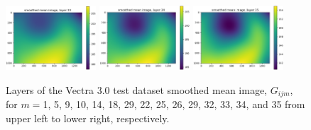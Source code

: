 \documentclass[letterpaper,11pt]{article}
\begin{document}
\begin{figure}[!ht]
\includegraphics[width=0.3\textwidth]{images/results/smoothed_mean_image_layers_vectra/smoothed_mean_image_layer_33}
\includegraphics[width=0.3\textwidth]{images/results/smoothed_mean_image_layers_vectra/smoothed_mean_image_layer_34}
\includegraphics[width=0.3\textwidth]{images/results/smoothed_mean_image_layers_vectra/smoothed_mean_image_layer_35}
\caption{\footnotesize Layers of the Vectra 3.0 test dataset smoothed mean image, $G_{ijm}$, for $m=$1, 5, 9, 10, 14, 18, 29, 22, 25, 26, 29, 32, 33, 34, and 35 from upper left to lower right, respectively.}
\label{fig:uncorrected_mean_image_layers_vectra}
\end{figure}
\end{document}
